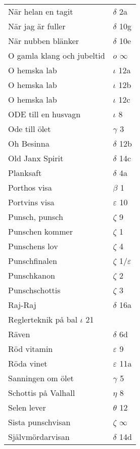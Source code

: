 \documentclass[a6paper,10pt]{article}
\begin{document}
\newpage
\setlength{\oddsidemargin}{-0.47in}
\begin{table}[!h]
\begin{tabular}{l l}
När helan en tagit	&$\delta$ 2a\\
När jag är fuller&	$\delta$ 10g\\
När nubben blänker&	$\delta$ 10e\\
O gamla klang och jubeltid&	$o$ $\infty$\\
O hemska lab&	$\iota$ 12a\\
O hemska lab&	$\iota$ 12b\\
O hemska lab&	$\iota$ 12c\\
ODE till en husvagn	&$\iota$ 8\\
Ode till ölet&	$\gamma$ 3\\
Oh Besinna&	$\delta$ 12b\\
Old Janx Spirit&	$\delta$ 14c\\
Planksaft	&$\delta$ 4a\\
Porthos visa&	$\beta$ 1\\
Portvins visa	&$\varepsilon$ 10\\
Punsch, punsch	&$\zeta$ 9\\
Punschen kommer&	$\zeta$ 1\\
Punschens lov&	$\zeta$ 4\\
Punschfinalen	&$\zeta$ 1/$\varepsilon$\\
Punschkanon&	$\zeta$ 2\\
Punschschottis	&$\zeta$ 3\\
Raj-Raj&	$\delta$ 16a\\
Reglerteknik på bal $\iota$ 21\\
Räven&	$\delta$ 6d\\
Röd vitamin	&$\varepsilon$ 9\\
Röda vinet&	$\varepsilon$ 11a\\
Sanningen om ölet&	$\gamma$ 5\\
Schottis på Valhall&	$\eta$ 8\\
Selen lever	&$\theta$ 12\\
Sista punschvisan	&$\zeta$ $\infty$\\
Självmördarvisan&	$\delta$ 14d\\
\end{tabular}
\end{table}
\end{document}
